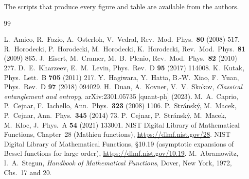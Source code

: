 \documentclass[preprint,12pt]{elsarticle}
\begin{document}
\noindent The scripts that produce every figure and table are available from
the authors.

\begin{thebibliography}{99}

 L.~Amico, R.~Fazio, A.~Osterloh, V.~Vedral,
Rev.\ Mod.\ Phys.\ \textbf{80} (2008) 517.
 R.~Horodecki, P.~Horodecki, M.~Horodecki, K.~Horodecki,
Rev.\ Mod.\ Phys.\ \textbf{81} (2009) 865.
 J.~Eisert, M.~Cramer, M.~B.~Plenio,
Rev.\ Mod.\ Phys.\ \textbf{82} (2010) 277.
 D.~E.~Kharzeev, E.~M.~Levin,
Phys.\ Rev.\ D \textbf{95} (2017) 114008.
 K.~Kutak, Phys.\ Lett.\ B \textbf{705} (2011) 217.
 Y.~Hagiwara, Y.~Hatta, B.-W.~Xiao, F.~Yuan,
Phys.\ Rev.\ D \textbf{97} (2018) 094029.
 H.~Duan, A.~Kovner, V.~V.~Skokov,
\emph{Classical entanglement and entropy}, arXiv:2301.05735 [quant-ph] (2023).
 M.~A.~Caprio, P.~Cejnar, F.~Iachello,
Ann.\ Phys.\ \textbf{323} (2008) 1106.
 P.~Str\'ansk\'y, M.~Macek, P.~Cejnar,
Ann.\ Phys.\ \textbf{345} (2014) 73.
 P.~Cejnar, P.~Str\'ansk\'y, M.~Macek, M.~Kloc,
J.~Phys.\ A \textbf{54} (2021) 133001.
 NIST Digital Library of Mathematical Functions, Chapter~28
(Mathieu functions), \url{https://dlmf.nist.gov/28}.
 NIST Digital Library of Mathematical Functions, \S10.19
(asymptotic expansions of Bessel functions for large order),
\url{https://dlmf.nist.gov/10.19}.
 M.~Abramowitz, I.~A.~Stegun, \emph{Handbook of
Mathematical Functions}, Dover, New York, 1972, Chs.~17 and 20.

\end{thebibliography}
\end{document}
